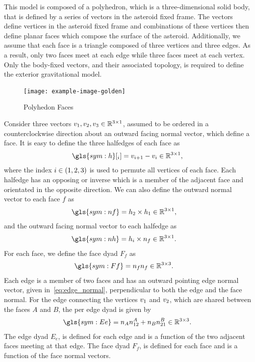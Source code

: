 This model is composed of a \gls{polyhedron}, which is a three-dimensional solid body, that is defined by a series of vectors in the asteroid fixed frame.
The vectors define vertices in the asteroid fixed frame and combinations of these vertices then define planar faces which compose the surface of the asteroid.
Additionally, we assume that each face is a triangle composed of three vertices and three edges.
As a result, only two faces meet at each edge while three faces meet at each vertex.
Only the body-fixed vectors, and their associated topology, is required to define the exterior gravitational model.

\begin{figure}[htbp]
    \centering
    \texttt{[image: example-image-golden]}
    \caption{Polyhedon Faces\label{fig:polyhedron_face}}
\end{figure}
Consider three vectors \( v_1, v_2, v_3 \in \mathbb{R}^{3 \times 1} \), assumed to be ordered in a counterclockwise direction about an outward facing normal vector, which define a face.
It is easy to define the three halfedges of each face as
\begin{align}\label{eq:edges}
    \gls{sym:h}[_i] = \vc{v}_{i+1} - \vc{v}_i \in \R^{3 \times 1 },
\end{align}
where the index \( i \in \left( 1,2,3 \right) \) is used to permute all vertices of each face.
Each halfedge has an opposing or inverse which is a member of the adjacent face and orientated in the opposite direction.
We can also define the outward normal vector to each face \( f \) as
\begin{align}\label{eq:face_normal}
    \gls{sym:nf} &= \vc{h}_2 \times \vc{h}_1 \in \R^{3 \times 1},
\end{align}
and the outward facing normal vector to each halfedge as
\begin{align}\label{eq:edge_normal}
    \gls{sym:nh} &=  \vc{h}_i \times \vc{n}_f \in \R^{3 \times 1}.
\end{align}
For each face, we define the face dyad \( F_f \) as
\begin{align}\label{eq:face_dyad}
    \gls{sym:Ff} &= \vc{n}_f \vc{n}_f \in \R^{3 \times 3}.
\end{align}
Each edge is a member of two faces and has an outward pointing edge normal vector, given in~\cref{eq:edge_normal}, perpendicular to both the edge and the face normal.
For the edge connecting the vertices \( v_1 \) and \( v_2 \), which are shared between the faces \(A\) and \( B\), the per edge dyad is given by
\begin{align}\label{eq:edge_dyad}
    \gls{sym:Ee} = \vc{n}_A \vc{n}_{12}^A + \vc{n}_B \vc{n}_{21}^B \in \R^{3 \times 3}.
\end{align}
The edge dyad \( E_e  \), is defined for each edge and is a function of the two adjacent faces meeting at that edge.
The face dyad \( F_f \), is defined for each face and is a function of the face normal vectors.

